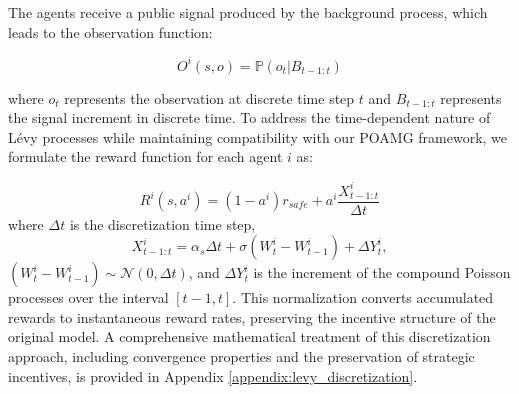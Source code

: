 \documentclass[a4paper,12pt]{report}
\begin{document}
The agents receive a public signal produced by the background process, which leads to the observation function:

\begin{equation}
    O^i(s, o) = \mathbb{P}(o_t | B_{t-1:t})
\end{equation}

where $o_t$ represents the observation at discrete time step $t$ and $B_{t-1:t}$ represents the signal increment in discrete time. To address the time-dependent nature of Lévy processes while maintaining compatibility with our POAMG framework, we formulate the reward function for each agent $i$ as:

\begin{equation}
    R^i(s, a^i) = (1-a^i)r_\textit{safe} + a^i \frac{X^i_{t-1:t}}{\Delta t}
\end{equation}
where $\Delta t$ is the discretization time step,
\begin{equation}
    X^i_{t-1:t} = \alpha_s \Delta t + \sigma (W^i_t - W^i_{t-1}) + \Delta Y^i_t,
\end{equation}
$(W^i_t - W^i_{t-1}) \sim \mathcal{N}(0, \Delta t)$, and $\Delta Y^i_t$ is the increment of the compound Poisson processes over the interval $[t-1, t]$.
This normalization converts accumulated rewards to instantaneous reward rates, preserving the incentive structure of the original model. A comprehensive mathematical treatment of this discretization approach, including convergence properties and the preservation of strategic incentives, is provided in Appendix \ref{appendix:levy_discretization}.
\end{document}
